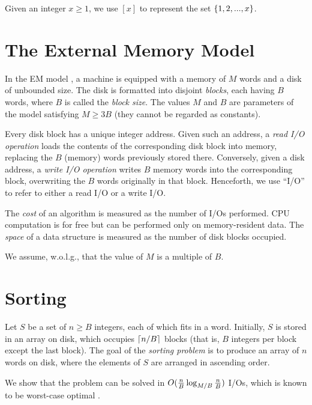  Given an integer $x \ge 1$, we use $[x]$ to represent the set $\{1, 2, ..., x\}$.

\section{The External Memory Model} \label{sec:em}

In the EM model \cite{av88}, a machine is equipped with a memory of $M$ words and a disk of unbounded size. The disk is formatted into disjoint {\em blocks}, each having $B$ words, where $B$ is called the {\em block size}. The values $M$ and $B$ are parameters of the model satisfying $M \ge 3B$ (they cannot be regarded as constants).

\vgap

Every disk block has a unique integer address. Given such an address, a {\em read I/O operation} loads the contents of the corresponding disk block into memory, replacing the $B$ (memory) words previously stored there. Conversely, given a disk address, a {\em write I/O operation} writes $B$ memory words into the corresponding block, overwriting the $B$ words originally in that block. Henceforth, we use ``I/O'' to refer to either a read I/O or a write I/O.

\vgap

The {\em cost} of an algorithm is measured as the number of I/Os performed. CPU computation is for free but can be performed only on memory-resident data. The {\em space} of a data structure is measured as the number of disk blocks occupied.

\vgap

We assume, w.o.l.g., that the value of $M$ is a multiple of $B$.

\section{Sorting} \label{sec:sort}

Let $S$ be a set of $n \ge B$ integers, each of which fits in a word. Initially, $S$ is stored in an array on disk, which occupies $\left \lceil n/B \right \rceil$ blocks (that is, $B$ integers per block except the last block). The goal of the {\em sorting problem} is to produce an array of $n$ words on disk, where the elements of $S$ are arranged in ascending order.

\vgap

We show that the problem can be solved in $O(\frac{n}{B} \log_{M/B} \frac{n}{B})$ I/Os, which is known to be worst-case optimal \cite{av88}.

